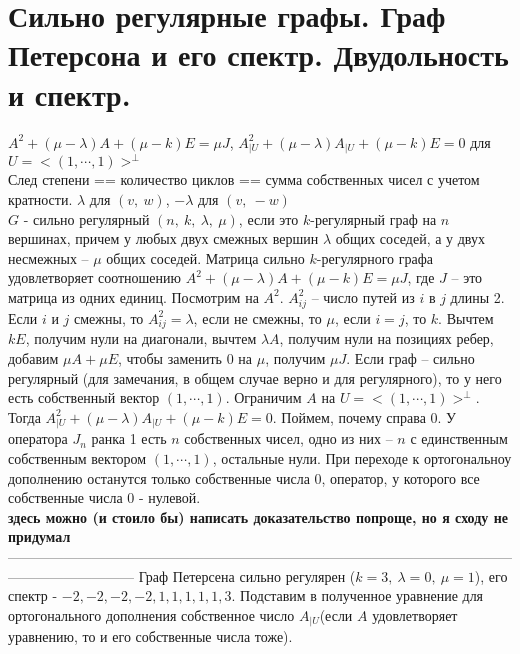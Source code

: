 \section{
	Сильно регулярные графы. Граф Петерсона и его спектр. Двудольность и спектр.
}

	
$A^2+(\mu-\lambda)A + (\mu-k)E=\mu J$,
$A_{|U}^2 + (\mu-\lambda)A_{|U} + (\mu-k)E = 0$ для 
$U = <(1,\cdots,1)>^{\bot}$\\
След степени == количество циклов == сумма собственных чисел с учетом кратности. $\lambda$ для 
$(v,\:w)$, $-\lambda$ для $(v,\:-w)$\\
	
	
$G$ - сильно регулярный $(n,~k,~\lambda,~\mu)$, если это $k$-регулярный граф на $n$ вершинах, причем у любых двух смежных вершин $\lambda$ общих соседей, а у двух несмежных -- $\mu$ общих соседей.
\thrm Матрица сильно $k$-регулярного графа удовлетворяет соотношению $A^2+(\mu-\lambda)A + (\mu-k)E=\mu J$, где $J$ -- это матрица из одних единиц.
\ethrm
\proof Посмотрим на $A^2$. $A^2_{ij}$ -- число путей из $i$ в $j$ длины 2. Если $i$ и $j$ смежны, то $A^2_{ij} = \lambda$, если не смежны, то $\mu$, если $i = j$, то $k$. Вычтем $kE$, получим нули на диагонали, вычтем $\lambda A$, получим нули на позициях ребер, добавим $\mu A + \mu E$, чтобы заменить 0 на $\mu$, получим $\mu J$.
\endproof
\rm Если граф -- сильно регулярный (для замечания, в общем случае верно и для регулярного), то у него есть собственный вектор $(1,\cdots,1)$. Ограничим $A$ на $U = <(1,\cdots,1)>^{\bot}$.
Тогда $A_{|U}^2 + (\mu-\lambda)A_{|U} + (\mu-k)E = 0$. Поймем, почему справа 0. У оператора $J_n$ ранка 1 есть $n$ собственных чисел, одно из них -- $n$ с единственным собственным вектором $(1,\cdots,1)$, остальные нули. При переходе к ортогональноу дополнению останутся только собственные числа 0, оператор, у которого все собственные числа 0 - нулевой.\\ 
\textbf{ здесь можно (и стоило бы) написать доказательство попроще, но я сходу не придумал}
\erm
---------------------------------------------------------------------------------------------------------------------------------------
\crl Граф Петерсена сильно регулярен ($k = 3,~\lambda=0,~\mu=1$), его спектр - ${-2,-2,-2,-2,1,1,1,1,1,3}$.
\ecrl
\proof
Подставим в полученное уравнение для ортогонального дополнения собственное число $A_{|U}$(если $A$ удовлетворяет уравнению, то и его собственные числа тоже). \\
